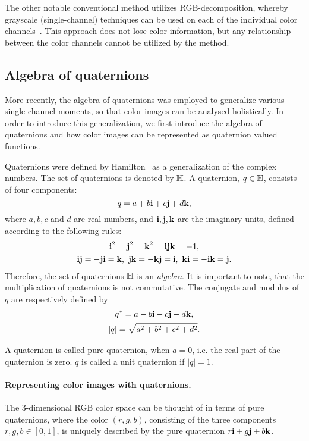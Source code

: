The other notable conventional method utilizes RGB-decomposition, whereby grayscale (single-channel) techniques can be used on each of the individual color channels~\cite{affine_color}. This approach does not lose color information, but any relationship between the color channels cannot be utilized by the method.


\subsection{Algebra of quaternions}
More recently, the algebra of quaternions was employed to generalize various single-channel moments, so that color images can be analysed holistically. In order to introduce this generalization, we first introduce the algebra of quaternions and how color images can be represented as quaternion valued functions.


Quaternions were defined by Hamilton~\cite{Hamilton} as a generalization of the complex numbers. The set of quaternions is denoted by $\mathbb{H}$. A quaternion, $q \in \mathbb{H}$, consists of four components:
\[
	q = a+b\textbf{i} +c\textbf{j}+d\textbf{k},
\]
where $a,b,c$ and $d$ are real numbers, and $\textbf{i},\textbf{j},\textbf{k}$ are the imaginary units, defined according to the following rules:
\[
\begin{gathered}
	\textbf{i}^2 = \textbf{j}^2 = \textbf{k}^2 = \textbf{i}\textbf{j}\textbf{k} = -1,\\
	\textbf{i}\textbf{j} = -\textbf{j}\textbf{i} = \textbf{k},\ \textbf{j}\textbf{k} = -\textbf{k}\textbf{j} = \textbf{i},\ \textbf{k}\textbf{i} = -\textbf{i}\textbf{k} = \textbf{j}.
\end{gathered}
\]
Therefore, the set of quaternions $\mathbb{H}$ is an \textit{algebra}. It is important to note, that the multiplication of quaternions is not commutative. The conjugate and modulus of $q$ are respectively defined by
\[
\begin{gathered}
q^* = a-b\textbf{i}-c\textbf{j}-d\textbf{k}, \\
|q| = \sqrt{a^2+b^2+c^2+d^2}.
\end{gathered}
\]

A quaternion is called pure quaternion, when $a = 0$, i.e. the real part of the quaternion is zero. $q$ is called a unit quaternion if $|q| = 1$.

\paragraph{Representing color images with quaternions.}
The 3-dimensional RGB color space can be thought of in terms of pure quaternions, where the color $(r,g,b)$, consisting of the three components $r,g,b \in [0,1]$, is uniquely described by the pure quaternion $r\textbf{i} + g\textbf{j} + b\textbf{k}$.


